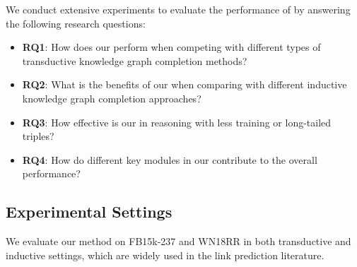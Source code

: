 \documentclass[runningheads]{llncs}
\begin{document}
We conduct extensive experiments to evaluate the performance of {\ours} by answering the following research questions:



\begin{itemize}
    \item \textbf{RQ1}: How does our {\ours} perform when competing with different types of transductive knowledge graph completion methods?
    \item \textbf{RQ2}: What is the benefits of our {\ours} when comparing with different inductive knowledge graph completion approaches?
    \item \textbf{RQ3}: How effective is our  {\ours} in reasoning with less training or long-tailed triples?
    \item \textbf{RQ4}: How do different key modules in our  {\ours} contribute to the overall performance?
    
\end{itemize}

 
\subsection{Experimental Settings}
We evaluate our method on FB15k-237 \cite{fb15k} and WN18RR \cite{wn18rr} in both transductive and inductive settings, which are widely used in the link prediction literature.
\end{document}
